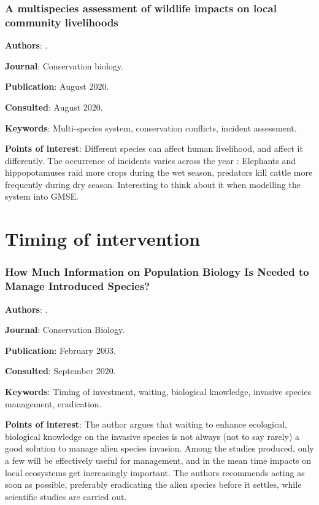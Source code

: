 \documentclass[12pt,a4paper]{article}
\begin{document}
\newpage

\subsubsection*{A multispecies assessment of wildlife impacts on local community livelihoods}

\textbf{Authors}: \cite{pozo2020multispecies}.

\textbf{Journal}: Conservation biology.

\textbf{Publication}: August 2020.

\textbf{Consulted}: August 2020.

\textbf{Keywords}: Multi-species system, conservation conflicts, incident assessment.

\textbf{Points of interest}: Different species can affect human livelihood, and affect it differently. The occurrence of incidents varies across the year : Elephants and hippopotamuses raid more crops during the wet season, predators kill cattle more frequently during dry season. Interesting to think about it when modelling the system into GMSE.

\newpage

\section*{Timing of intervention}

\subsubsection*{How Much Information on Population Biology Is Needed to Manage Introduced Species?}

\textbf{Authors}: \cite{simberloff2003information}.

\textbf{Journal}: Conservation Biology.

\textbf{Publication}: February 2003.

\textbf{Consulted}: September 2020.

\textbf{Keywords}: Timing of investment, waiting, biological knowledge, invasive species management, eradication.

\textbf{Points of interest}: The author argues that waiting to enhance ecological, biological knowledge on the invasive species is not always (not to say rarely) a good solution to manage alien species invasion. Among the studies produced, only a few will be effectively useful for management, and in the mean time impacts on local ecosystems get increasingly important. The authors recommends acting as soon as possible, preferably eradicating the alien species before it settles, while scientific studies are carried out.
\end{document}
